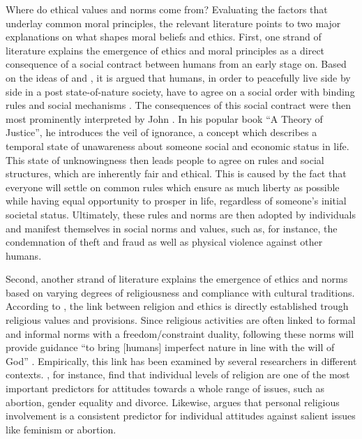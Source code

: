 \documentclass{article}[hidelinks]
\begin{document}
Where do ethical values and norms come from? Evaluating the factors that underlay common moral principles, the relevant literature points to two major explanations on what shapes moral beliefs and ethics. First, one strand of literature explains the emergence of ethics and moral principles as a direct consequence of a social contract between humans from an early stage on. Based on the ideas of \cite{Hobbes.1968} and \cite{Rousseau.1974}, it is argued that humans, in order to peacefully live side by side in a post state-of-nature society, have to agree on a social order with binding rules and social mechanisms \citep{Midgley.1991}. The consequences of this social contract were then most prominently interpreted by John \cite{Rawls.1971}. In his popular book “A Theory of Justice”, he introduces the veil of ignorance, a concept which describes a temporal state of unawareness about someone social and economic status in life. This state of unknowingness then leads people to agree on rules and social structures, which are inherently fair and ethical. This is caused by the fact that everyone will settle on common rules which ensure as much liberty as possible while having equal opportunity to prosper in life, regardless of someone’s initial societal status. Ultimately, these rules and norms are then adopted by individuals and manifest themselves in social norms and values, such as, for instance, the condemnation of theft and fraud as well as physical violence against other humans.

Second, another strand of literature explains the emergence of ethics and norms based on varying degrees of religiousness and compliance with cultural traditions. According to \cite{Parboteeah.2008}, the link between religion and ethics is directly established trough religious values and provisions. Since religious activities are often linked to formal and informal norms with a freedom/constraint duality, following these norms will provide guidance “to bring [humans] imperfect nature in line with the will of God” \citep[~p.4]{Midgley.1991}. 
\newline Empirically, this link has been examined by several researchers in different contexts. \cite{Jelen.2003}, for instance, find that individual levels of religion are one of the most important predictors for attitudes towards a whole range of issues, such as abortion, gender equality and divorce. Likewise, \cite{Adamczyk.2013} argues that personal religious involvement is a consistent predictor for individual attitudes against salient issues like feminism or abortion. 
\end{document}
